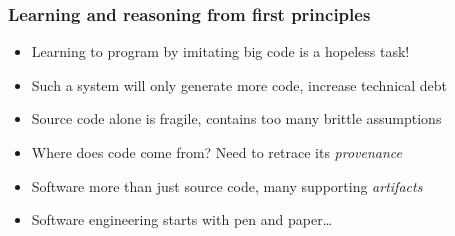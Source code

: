 \documentclass{beamer}
\begin{document}
\begin{frame}
  \frametitle{Learning and reasoning from first principles}
  \begin{itemize}
    \item Learning to program by imitating big code is a hopeless task!
    \item Such a system will only generate more code, increase technical debt
    \item Source code alone is fragile, contains too many brittle assumptions
    \item Where does code come from? Need to retrace its \textit{provenance}
    \item Software more than just source code, many supporting \textit{artifacts}
    \item Software engineering starts with pen and paper\ldots
  \end{itemize}
  \begin{figure}[H]
    \centering


  \end{figure}
\end{frame}
\end{document}
